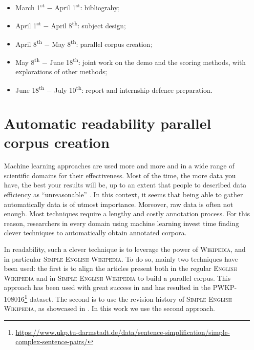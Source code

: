 \documentclass[a4paper, 11pt, onepage]{scrreprt}
\newcommand\wiki{\textsc{Wikipedia}}
\newcommand\ew{\textsc{English Wikipedia}}
\newcommand\sew{\textsc{Simple English Wikipedia}}
\begin{document}
\begin{itemize}
\item March 1\textsuperscript{st} − April 1\textsuperscript{st}:
  bibliograhy;
\item April 1\textsuperscript{st} − April 8\textsuperscript{th}:
  subject design;
\item April 8\textsuperscript{th} − May 8\textsuperscript{th}:
  parallel corpus creation;
\item May 8\textsuperscript{th} − June 18\textsuperscript{th}:
  joint work on the demo and the scoring methods, with explorations of
  other methods;
\item June 18\textsuperscript{th} − July 10\textsuperscript{th}:
  report and internship defence preparation.
\end{itemize}

\section{Automatic readability parallel corpus creation}
\label{sec:corpus}

Machine learning approaches are used more and more and in a wide range
of scientific domains for their effectiveness. Most of the time, the
more data you have, the best your results will be, up to an extent
that people to described data efficiency as “unreasonable”
\cite{halevy2009unreasonable}. In this context, it seems that being
able to gather automatically data is of utmost importance. Moreover,
raw data is often not enough. Most techniques require a lengthy and
costly annotation process. For this reason, researchers in every
domain using machine learning invest time finding clever techniques to
automatically obtain annotated corpora.

In readability, such a clever technique is to leverage the power of
\wiki, and in particular \sew. To do so, mainly two techniques have
been used: the first is to align the articles present both in the
regular \ew{} and in \sew{} to build a parallel corpus. This approach
has been used with great success in
\cite{zhu-bernhard-gurevych:2010:PAPERS} and has resulted in the
PWKP-108016\footnote{\url{https://www.ukp.tu-darmstadt.de/data/sentence-simplification/simple-complex-sentence-pairs/}}
dataset. The second is to use the revision history of \sew, as
showcased in \cite{yatskar2010sake}. In this work we use the second
approach.
\end{document}
